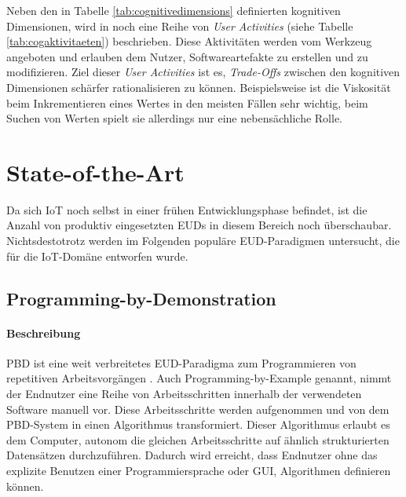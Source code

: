 Neben den in Tabelle \ref{tab:cognitivedimensions} definierten kognitiven Dimensionen, wird in \cite{green2000instructions} noch eine Reihe von \textit{User Activities} (siehe Tabelle \ref{tab:cogaktivitaeten}) beschrieben. Diese Aktivitäten werden vom Werkzeug angeboten und erlauben dem Nutzer, Softwareartefakte zu erstellen und zu modifizieren. Ziel dieser \textit{User Activities} ist es, \textit{Trade-Offs} zwischen den kognitiven Dimensionen schärfer rationalisieren zu können. Beispielsweise ist die Viskosität beim Inkrementieren eines Wertes in den meisten Fällen sehr wichtig, beim Suchen von Werten spielt sie allerdings nur eine nebensächliche Rolle. 

\section{State-of-the-Art}\label{subsec:stateoftheart}
Da sich \ac{IoT} noch selbst in einer frühen Entwicklungsphase befindet, ist die Anzahl von produktiv eingesetzten \acp{EUD} in diesem Bereich noch überschaubar. Nichtsdestotrotz werden im Folgenden populäre \ac{EUD}-Paradigmen untersucht, die für die \ac{IoT}-Domäne entworfen wurde. 

\subsection{Programming-by-Demonstration}
\paragraph{Beschreibung} \acf{PBD} ist eine weit verbreitetes \ac{EUD}-Paradigma zum Programmieren von repetitiven Arbeitsvorgängen \cite{cypher1993pbd}. Auch Programming-by-Example genannt, nimmt der Endnutzer eine Reihe von Arbeitsschritten innerhalb der verwendeten Software manuell vor. Diese Arbeitsschritte werden aufgenommen und von dem \ac{PBD}-System in einen Algorithmus transformiert. Dieser Algorithmus erlaubt es dem Computer, autonom die gleichen Arbeitsschritte auf ähnlich strukturierten Datensätzen durchzuführen. Dadurch wird erreicht, dass Endnutzer ohne das explizite Benutzen einer Programmiersprache oder \ac{GUI}, Algorithmen definieren können.

